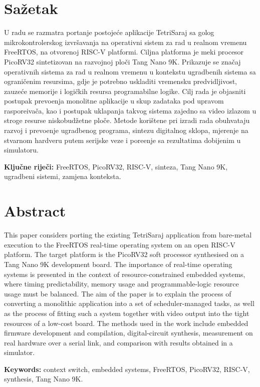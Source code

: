 \chapter*{Sa\v{z}etak}

U radu se razmatra portanje postoje\'ce aplikacije TetriSaraj sa golog
mikrokontrolerskog izvr\v{s}avanja na operativni sistem za rad u realnom vremenu
FreeRTOS, na otvorenoj RISC-V platformi. Ciljna platforma je meki procesor
PicoRV32 sintetizovan na razvojnoj plo\v{c}i Tang Nano 9K. Prikazuje se zna\v{c}aj
operativnih sistema za rad u realnom vremenu u kontekstu ugradbenih sistema sa
ograni\v{c}enim resursima, gdje je potrebno uskladiti vremensku predvidljivost,
zauze\'ce memorije i logi\v{c}kih resursa programabilne logike. Cilj rada je
objasniti postupak prevo\dj{}enja monolitne aplikacije u skup zadataka pod
upravom raspore\dj{}iva\v{c}a, kao i postupak uklapanja takvog sistema zajedno sa
video izlazom u stroge resurse niskobud\v{z}etne plo\v{c}e. Metode kori\v{s}tene
pri izradi rada obuhvataju razvoj i prevo\dj{}enje ugradbenog programa, sintezu
digitalnog sklopa, mjerenje na stvarnom hardveru putem serijske veze i pore\dj{}enje
sa rezultatima dobijenim u simulatoru.

\vspace{0.5cm}
\noindent\textbf{Klju\v{c}ne rije\v{c}i:} FreeRTOS, PicoRV32, RISC-V, sinteza,
Tang Nano 9K, ugradbeni sistemi, zamjena konteksta.

\chapter*{Abstract}

This paper considers porting the existing TetriSaraj application from bare-metal
execution to the FreeRTOS real-time operating system on an open RISC-V platform.
The target platform is the PicoRV32 soft processor synthesised on a Tang Nano 9K
development board. The importance of real-time operating systems is presented in
the context of resource-constrained embedded systems, where timing
predictability, memory usage and programmable-logic resource usage must be
balanced. The aim of the paper is to explain the process of converting a
monolithic application into a set of scheduler-managed tasks, as well as the
process of fitting such a system together with video output into the tight
resources of a low-cost board. The methods used in the work include embedded
firmware development and compilation, digital-circuit synthesis, measurement on
real hardware over a serial link, and comparison with results obtained in a
simulator.

\vspace{0.5cm}
\noindent\textbf{Keywords:} context switch, embedded systems, FreeRTOS,
PicoRV32, RISC-V, synthesis, Tang Nano 9K.
